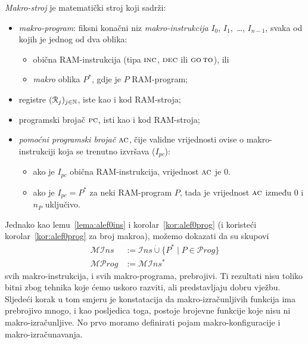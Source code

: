 \begin{definicija}
\emph{Makro-stroj} je matematički stroj koji sadrži:
\begin{itemize}
    \item \emph{makro-program}: fiksni konačni niz \emph{makro-instrukcija} $I_0$, $I_1$,~\ldots, $I_{n-1}$, svaka od kojih je jednog od dva oblika:
    \begin{itemize}
        \item obična RAM-instrukcija (tipa $\textsc{inc}$, $\textsc{dec}$ ili $\textsc{go\,to}$), ili
        \item  \emph{makro} oblika $P^*$, gdje je $P$ RAM-program;
    \end{itemize}
    \item registre $(\mathcal R_{j})_{j\in{\mathbb N}}$, iste kao i kod RAM-stroja;
    \item programski brojač $\textsc{pc}$, isti kao i kod RAM-stroja;
    \item \emph{pomoćni programski brojač} $\textsc{ac}$, čije validne vrijednosti ovise o makro-instrukciji koja se trenutno izvršava ($I_{pc}$):
    \begin{itemize}
        \item ako je $I_{pc}$ obična RAM-instrukcija, vrijednost $\textsc{ac}$ je $0$.
        \item ako je $I_{pc}=P^*$ za neki RAM-program $P$, tada je vrijednost $\textsc{ac}$ između $0$ i $n_P$ uključivo.\qedhere
    \end{itemize}
\end{itemize}
\end{definicija}

Jednako kao lemu~\ref{lema:alef0ins} i korolar~\ref{kor:alef0prog} (i koristeći korolar~\ref{kor:alef0prog} za broj makroa), možemo dokazati da su skupovi
\begin{align}
\mathcal{MI}ns&:=\mathcal Ins\mathbin{\dot\cup}\{P^*\mid P\in\mathcal Prog\}\\
\mathcal{MP}rog&:=\mathcal{MI}ns^*
\end{align}
svih makro-instrukcija, i svih makro-programa, prebrojivi. Ti rezultati nisu toliko bitni zbog tehnika koje ćemo uskoro razviti, ali predstavljaju dobru vježbu. Sljedeći korak u tom smjeru je konstatacija da makro-izračunljivih funkcija ima prebrojivo mnogo, i kao posljedica toga, postoje brojevne funkcije koje nisu ni makro-izračunljive. No prvo moramo definirati pojam makro-konfiguracije i makro-izračunavanja.

